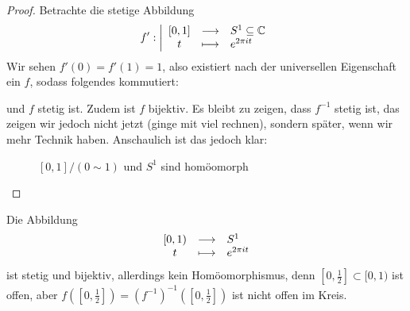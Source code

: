 \begin{proof}
    Betrachte die stetige Abbildung
        \begin{equation*}
        f': \left| \begin{array}{c c l} 
            [0,1] & \longrightarrow & S^1\subseteq \mathbb{C} \\
        t & \longmapsto &  e^{2\pi it}
        \end{array} \right.
    \end{equation*}
    Wir sehen $f'(0) = f'(1) = 1$, also existiert nach der universellen Eigenschaft ein  $f$, sodass folgendes kommutiert: \\
    und $f$ stetig ist. Zudem ist  $f$ bijektiv. Es bleibt zu zeigen, dass  $f^{-1}$ stetig ist, das zeigen wir jedoch nicht jetzt (ginge mit viel rechnen), sondern später, wenn wir mehr Technik haben. Anschaulich ist das jedoch klar:
\begin{figure}[ht]
    \centering
    \caption{$[0,1] / (0\sim 1)$ und $S^1$ sind homöomorph}
    \label{fig:intervall-und-kreis-sind-homeomorph}
\end{figure}
\end{proof}
\begin{remark}
    Die Abbildung
        \begin{equation*}
        \begin{array}{c c l} 
            [0,1) & \longrightarrow & S^1 \\
        t & \longmapsto &  e^{2\pi it}
        \end{array}
    \end{equation*}
    ist stetig und bijektiv, allerdings kein Homöomorphismus, denn $\left[ 0, \frac{1}{2} \right] \subset [0,1)$ ist offen, aber $f(\left[ 0,\frac{1}{2} \right] ) = \left( f^{-1} \right) ^{-1}\left( \left[ 0,\frac{1}{2} \right]  \right) $ ist nicht offen im Kreis.
\end{remark}
